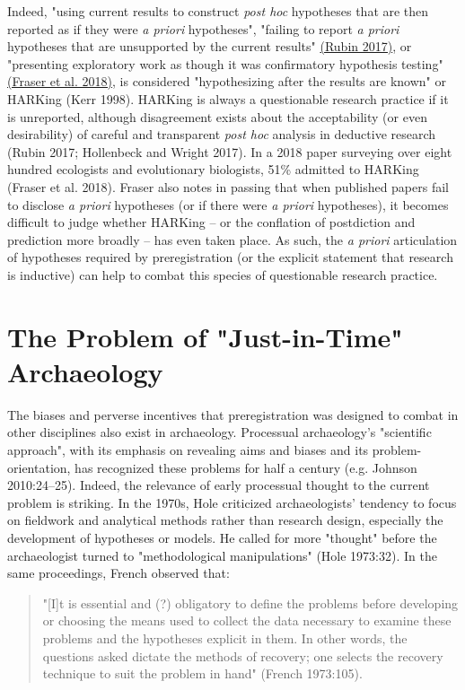\documentclass[article]{sa}
\begin{document}
Indeed, "using current results to construct \emph{post hoc} hypotheses
that are then reported as if they were \emph{a priori} hypotheses",
"failing to report \emph{a priori} hypotheses that are unsupported by
the current results" \href{https://paperpile.com/c/9nVMK6/Og0rj}{(Rubin
2017)}, or "presenting exploratory work as though it was confirmatory
hypothesis testing" \href{https://paperpile.com/c/9nVMK6/eWauu}{(Fraser
et al. 2018)}, is considered "hypothesizing after the results are known"
or HARKing (Kerr 1998). HARKing is always a questionable research
practice if it is unreported, although disagreement exists about the
acceptability (or even desirability) of careful and transparent
\emph{post hoc} analysis in deductive research (Rubin 2017; Hollenbeck
and Wright 2017). In a 2018 paper surveying over eight hundred
ecologists and evolutionary biologists, 51\% admitted to HARKing (Fraser
et al. 2018). Fraser also notes in passing that when published papers
fail to disclose \emph{a priori} hypotheses (or if there were \emph{a
priori} hypotheses), it becomes difficult to judge whether HARKing --
or the conflation of postdiction and prediction more broadly -- has
even taken place. As such, the \emph{a priori} articulation of
hypotheses required by preregistration (or the explicit statement that
research is inductive) can help to combat this species of questionable
research practice.

\section{The Problem of "Just-in-Time"
Archaeology}

The biases and perverse incentives that preregistration was designed to
combat in other disciplines also exist in archaeology. Processual
archaeology's "scientific approach", with its emphasis on revealing aims
and biases and its problem-orientation, has recognized these problems
for half a century (e.g. Johnson 2010:24--25). Indeed, the relevance of
early processual thought to the current problem is striking. In the
1970s, Hole criticized archaeologists' tendency to focus on fieldwork
and analytical methods rather than research design, especially the
development of hypotheses or models. He called for more "thought" before
the archaeologist turned to "methodological manipulations" (Hole
1973:32). In the same proceedings, French observed that:

\begin{quote}
    
"{[}I{]}t is essential and (?) obligatory to define the problems before
developing or choosing the means used to collect the data necessary to
examine these problems and the hypotheses explicit in them. In other
words, the questions asked dictate the methods of recovery; one selects
the recovery technique to suit the problem in hand" (French 1973:105).

\end{quote}
\end{document}
